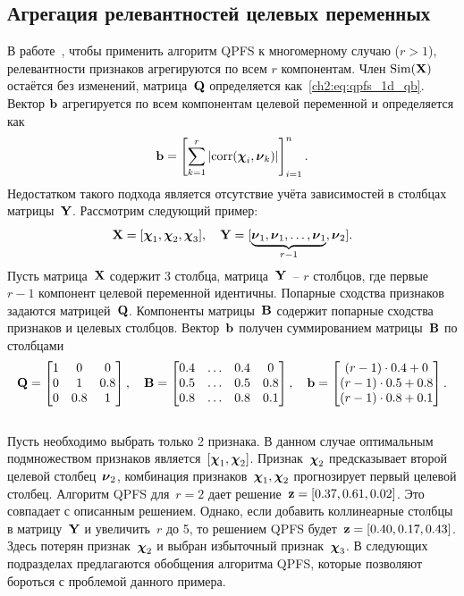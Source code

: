 \subsection{Агрегация релевантностей целевых переменных}

В работе~\cite{motrenko2018multi}, чтобы применить алгоритм QPFS к многомерному случаю ($r > 1$), релевантности признаков агрегируются по всем $r$ компонентам. Член $\text{Sim}(\mathbf{X})$ остаётся без изменений, матрица~$\mathbf{Q}$ определяется как~\eqref{ch2:eq:qpfs_1d_qb}. Вектор $\mathbf{b}$ агрегируется по всем компонентам целевой переменной и определяется как
\begin{equation*}
\mathbf{b} = \left[\sum_{k=1}^r|\text{corr}(\boldsymbol{\chi}_i, \boldsymbol{\nu}_k)|\right]_{i=1}^n.
\end{equation*}
Недостатком такого подхода является отсутствие учёта зависимостей в столбцах матрицы~$\mathbf{Y}$. Рассмотрим следующий пример:
\begin{equation*}
\mathbf{X} = [\boldsymbol{\chi}_1, \boldsymbol{\chi}_2, \boldsymbol{\chi}_3], \quad \mathbf{Y} = [\underbrace{\boldsymbol{\nu}_1, \boldsymbol{\nu}_1, \dots, \boldsymbol{\nu}_1}_{r-1}, \boldsymbol{\nu}_2].
\end{equation*}
Пусть матрица~$\mathbf{X}$ содержит 3 столбца, матрица~$\mathbf{Y}$~-- $r$ столбцов, где первые $r-1$ компонент целевой переменной идентичны.
Попарные сходства признаков задаются матрицей~$\mathbf{Q}$.
Компоненты матрицы~$\mathbf{B}$ содержит попарные сходства признаков и целевых столбцов.
Вектор~$\mathbf{b}$ получен суммированием матрицы~$\mathbf{B}$ по столбцами
\begin{equation}
\mathbf{Q} = \begin{bmatrix} 1 & 0 & 0\\ 0 & 1 & 0.8 \\ 0 & 0.8 & 1 \end{bmatrix}, \quad
\mathbf{B} = \begin{bmatrix} 0.4 & \dots & 0.4 & 0 \\ 0.5 & \dots & 0.5 & 0.8 \\ 0.8 & \dots & 0.8 & 0.1 \end{bmatrix}, \quad
\mathbf{b} = \begin{bmatrix} (r-1) \cdot 0.4 + 0 \\ (r-1) \cdot 0.5 + 0.8 \\ (r-1) \cdot 0.8 + 0.1 \end{bmatrix}.
\label{ch2:eq:qpfs_example}
\end{equation}
\vspace{0.5cm} \\
Пусть необходимо выбрать только 2 признака.
В данном случае оптимальным подмножеством признаков является~$[\boldsymbol{\chi}_1, \boldsymbol{\chi}_2]$.
Признак~$\boldsymbol{\chi}_2$ предсказывает второй целевой столбец~$\boldsymbol{\nu}_2$, комбинация признаков~$\boldsymbol{\chi}_1, \boldsymbol{\chi}_2$ прогнозирует первый целевой столбец.
Алгоритм QPFS для~$r=2$ дает решение~$\mathbf{z} = [0.37, 0.61, 0.02]$. Это совпадает с описанным решением.
Однако, если добавить коллинеарные столбцы в матрицу~$\mathbf{Y}$ и увеличить~$r$ до 5, то решением QPFS будет~$\mathbf{z} = [0.40, 0.17, 0.43]$.
Здесь потерян признак~$\boldsymbol{\chi}_2$ и выбран избыточный признак~$\boldsymbol{\chi}_3$.
В следующих подразделах предлагаются обобщения алгоритма QPFS, которые позволяют бороться с проблемой данного примера.


